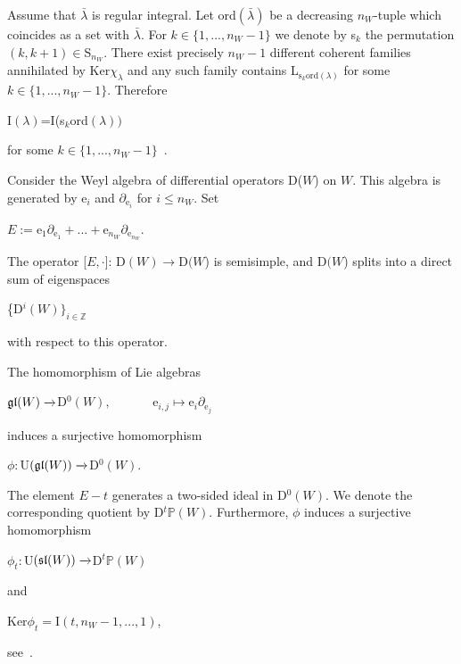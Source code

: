 \documentclass[12pt]{amsart}
\theoremstyle{definition}\newtheorem{theorem}{Theorem}[section]
\theoremstyle{definition}\newtheorem{definition}[proposition]{Definition}
\theoremstyle{remark}\newtheorem{example}[proposition]{Example}
\renewcommand{\to}[1][]{\xrightarrow{#1}}
\begin{document}
Assume that $\bar\lambda$ is regular integral. Let ord$(\bar\lambda)$ be a decreasing $n_W$-tuple which coincides as a set with $\bar\lambda$. For $k\in\{1,..., n_W-1\}$ we denote by s$_k$ the permutation $(k, k+1)\in$S$_{n_W}$. There exist precisely $n_W-1$ different coherent families annihilated by Ker$\chi_\lambda$ and any such family contains L$_{\mathrm s_k\mathrm{ord}(\lambda)}$ for some $k\in\{1,..., n_W-1\}$. Therefore \begin{center}I$(\lambda)$=I(s$_k$ord$(\lambda))$\end{center} for some $k\in\{1,..., n_W-1\}$~\cite{M}.

Consider the Weyl algebra of differential operators D($W$) on $W$. This algebra is generated by e$_i$ and $\partial_{\mathrm e_i}$ for $i\le n_W$. Set \begin{center}$E:= $e$_1\partial_{\mathrm e_1}+...+$e$_{n_W}\partial_{\mathrm e_{n_W}}$.\end{center}The operator [$E, \cdot$]: D$(W)\to$D$(W$) is semisimple, and D$(W$) splits into a direct sum of eigenspaces \begin{center}\{D$^i(W)\}_{i\in\mathbb Z}$\end{center} with respect to this operator.

The homomorphism of Lie algebras \begin{center}$\frak{gl}(W)\to$D$^0(W),\hspace{40pt}$e$_{i, j}\mapsto$e$_i\partial_{\mathrm e_j}$\end{center}induces a surjective homomorphism \begin{center}$\phi:$U$(\frak{gl}(W))\to$D$^0(W)$.\end{center} The element $E-t$ generates a two-sided ideal in D$^0(W)$. We denote the corresponding quotient by D$^t\mathbb P(W)$. Furthermore, $\phi$ induces a surjective homomorphism \begin{center} $\phi_t:$U$(\frak{sl}(W))\to$D$^t\mathbb P(W)$\end{center}and\begin{center}Ker$\phi_t=$I$(t, n_W-1,...,1)$,\end{center}see~\cite{M}.
\end{document}
